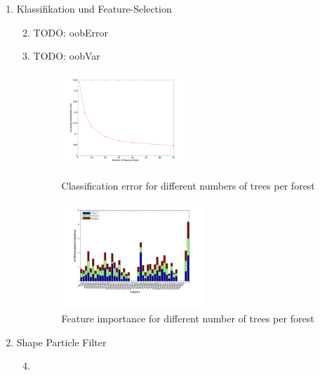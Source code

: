 \documentclass[]{report}
\newlength\figureheight
\newlength\figurewidth
\begin{document}
\begin{enumerate}
		\item Klassifikation und Feature-Selection
			\begin{enumerate}
				\setcounter{enumii}{1}
				\item TODO: oobError
				\item TODO: oobVar
			\setlength\figureheight{3.5cm}
			\setlength\figurewidth{\textwidth}
				\begin{figure}
					\centering
					\includegraphics[height=3.5cm]{figures/OOBErr.png}
					\caption{Classification error for different numbers of trees per forest}
					\label{fig:oobErr}
					\qquad
					\centering
					\includegraphics[width=\textwidth,height=4cm]{figures/OOBVarStacked.png}
					\caption{Feature importance for different number of trees per forest}
					\label{fig:oobVar}
				\end{figure}
			\end{enumerate}
		
		\item Shape Particle Filter
			\begin{enumerate}
				\setcounter{enumii}{3}
				\item
				

\end{enumerate}
\end{enumerate}
\end{document}
